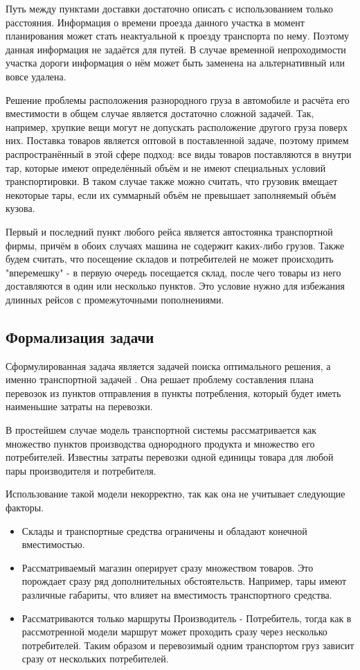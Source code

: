 	Путь между пунктами доставки достаточно описать с использованием только расстояния. Информация о времени проезда данного участка в момент планирования может стать неактуальной к проезду транспорта по нему. Поэтому данная информация не задаётся для путей. В случае временной непроходимости участка дороги информация о нём может быть заменена на альтернативный или вовсе удалена.
	
	Решение проблемы расположения разнородного груза в автомобиле и расчёта его вместимости в общем случае является достаточно сложной задачей. Так, например, хрупкие вещи могут не допускать расположение другого груза поверх них. Поставка товаров является оптовой в поставленной задаче, поэтому примем распространённый в этой сфере подход: все виды товаров поставляются в внутри тар, которые имеют определённый объём и не имеют специальных условий транспортировки. В таком случае также можно считать, что грузовик вмещает некоторые тары, если их суммарный объём не превышает заполняемый объём кузова.
	
	Первый и последний пункт любого рейса является автостоянка транспортной фирмы, причём в обоих случаях машина не содержит каких-либо грузов. Также будем считать, что посещение складов и потребителей не может происходить "вперемешку" - в первую очередь посещается склад, после чего товары из него доставляются в один или несколько пунктов. Это условие нужно для избежания длинных рейсов с промежуточными пополнениями.

\subsection{Формализация задачи}
	Сформулированная задача является задачей поиска оптимального решения, а именно транспортной задачей \cite{trans:main}. Она решает проблему составления плана перевозок из пунктов отправления в пункты потребления, который будет иметь наименьшие затраты на перевозки. 
	
	В простейшем случае модель транспортной системы рассматривается как множество пунктов производства однородного продукта и множество его потребителей. Известны затраты перевозки одной единицы товара для любой пары производителя и потребителя.
	
	Использование такой модели некорректно, так как она не учитывает следующие факторы.
	\begin{itemize}
		\item Склады и транспортные средства ограничены и обладают конечной вместимостью.
		\item Рассматриваемый магазин оперирует сразу множеством товаров. Это порождает сразу ряд дополнительных обстоятельств. Например, тары имеют различные габариты, что влияет на вместимость транспортного средства.
		\item Рассматриваются только маршруты Производитель - Потребитель, тогда как в рассмотренной модели маршрут может проходить сразу через несколько потребителей. Таким образом и перевозимый одним транспортом груз зависит сразу от нескольких потребителей.
	\end{itemize}
		
